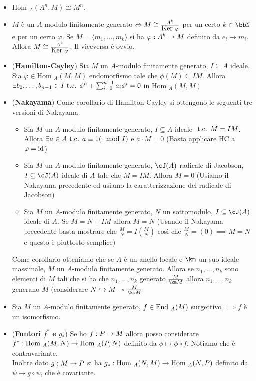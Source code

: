 \documentclass[a4paper,NoNotes,GeneralMath]{stdmdoc}
\newcommand{\srar}{\twoheadrightarrow}
\newcommand{\hrar}{\hookrightarrow}
\newcommand{\Hom}{\text{Hom }}
\newcommand{\gen}[1]{\langle {#1} \rangle}
\begin{document}
\begin{itemize}
		\item $\Hom_A(A^n, M) \cong M^n$.
		\item $M$ è un $A$-modulo finitamente generato $\Leftrightarrow M \cong \frac{A^k}{\mbox{Ker } \varphi}$ per un certo $k \in \bbN$ e per un certo $\varphi$. Se $M = \gen{m_1, \ldots, m_k}$ si ha $\varphi: A^k \rightarrow M$ definito da $e_i \mapsto m_i$. Allora $M \cong \frac{A^k}{\mbox{Ker } \varphi}$. Il viceversa è ovvio.
		\item ({\bf Hamilton-Cayley}) Sia $M$ un $A$-modulo finitamente generato, $I \subseteq A$ ideale. Sia $\varphi \in \Hom_A(M, M)$ endomorfismo tale che $\phi(M) \subseteq IM$. Allora $\exists b_0, \ldots, b_{n-1} \in I \mbox{ t.c. } \phi^n + \sum_{i=0}^{n-1} a_i \phi^i = 0$ in $\Hom_A(M, M)$
		\item ({\bf Nakayama}) Come corollario di Hamilton-Cayley si ottengono le seguenti tre versioni di Nakayama:
			\begin{itemize}
				\item Sia $M$ un $A$-modulo finitamente generato, $I \subseteq A$ ideale $\mbox{ t.c. } M = IM$. Allora $\exists a \in A \mbox{ t.c. } a \equiv 1 (\mod I)$ e $a \cdot M = 0$ (Basta applicare HC a $\varphi = \mbox{id}$)
				\item Sia $M$ un $A$-modulo finitamente generato, $\cJ(A)$ radicale di Jacobson, $I \subseteq \cJ(A)$ ideale di $A$ tale che $M = IM$. Allora $M = 0$ (Usiamo il Nakayama precedente ed usiamo la caratterizzazione del radicale di Jacobson)
				\item Sia $M$ un $A$-modulo finitamente generato, $N$ un sottomodulo, $I \subseteq \cJ(A)$ ideale di $A$. Se $M = N + IM$ allora $M = N$ (Usando il Nakayama precedente basta mostrare che $\frac{M}{N} = I(\frac{M}{N})$ così che $\frac{M}{N} = (0) \implies M = N$ e questo è piuttosto semplice)
			\end{itemize}
			Come corollario otteniamo che se $A$ è un anello locale e $\km$ un suo ideale massimale, $M$ un $A$-modulo finitamente generato. Allora se $n_1, \ldots, n_k$ sono elementi di $M$ tali che si ha che $\overline{n_1}, \ldots, \overline{n_k}$ generato $\frac{M}{\km M}$ allora $n_1, \ldots, n_k$ generano $M$ (considerare $N \hrar M \srar \frac{M}{\km M}$
		\item Sia $M$ un $A$-modulo finitamente generato, $f \in \mbox{End }_A(M)$ surgettivo $\implies f$ è un isomorfismo.
		\item ({\bf Funtori $f^*$ e $g_*$}) Se ho $f: P \rightarrow M$ allora posso considerare $f^*: \Hom_A(M, N) \rar \Hom_A(P, N)$ definito da $\phi \mapsto \phi \circ f$. Notiamo che è contravariante. \\
		Inoltre dato $g: M \rightarrow P$ si ha $g_*: \Hom_A(N, M) \rar \Hom_A(N, P)$ definito da $\psi \mapsto g \circ \psi$, che è covariante. 
	\end{itemize}
	
\end{document}
